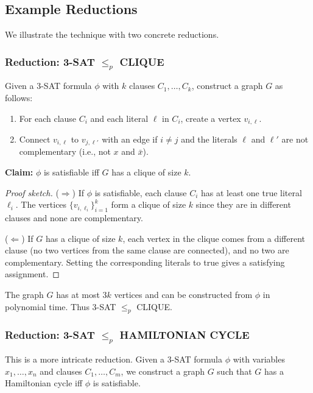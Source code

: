 \subsection{Example Reductions}

We illustrate the technique with two concrete reductions.

\subsubsection*{Reduction: 3-SAT $\leq_p$ CLIQUE}

Given a 3-SAT formula $\phi$ with $k$ clauses $C_1, \ldots, C_k$, construct a graph $G$ as follows:
\begin{enumerate}
  \item For each clause $C_i$ and each literal $\ell$ in $C_i$, create a vertex $v_{i,\ell}$.
  \item Connect $v_{i,\ell}$ to $v_{j,\ell'}$ with an edge if $i \neq j$ and the literals $\ell$ and $\ell'$ are not complementary (i.e., not $x$ and $\bar{x}$).
\end{enumerate}

\textbf{Claim:} $\phi$ is satisfiable iff $G$ has a clique of size $k$.

\begin{proof}[Proof sketch]
($\Rightarrow$) If $\phi$ is satisfiable, each clause $C_i$ has at least one true literal $\ell_i$. The vertices $\{v_{i,\ell_i}\}_{i=1}^k$ form a clique of size $k$ since they are in different clauses and none are complementary.

($\Leftarrow$) If $G$ has a clique of size $k$, each vertex in the clique comes from a different clause (no two vertices from the same clause are connected), and no two are complementary. Setting the corresponding literals to true gives a satisfying assignment.
\end{proof}

The graph $G$ has at most $3k$ vertices and can be constructed from $\phi$ in polynomial time. Thus 3-SAT $\leq_p$ CLIQUE.

\subsubsection*{Reduction: 3-SAT $\leq_p$ HAMILTONIAN CYCLE}

This is a more intricate reduction. Given a 3-SAT formula $\phi$ with variables $x_1, \ldots, x_n$ and clauses $C_1, \ldots, C_m$, we construct a graph $G$ such that $G$ has a Hamiltonian cycle iff $\phi$ is satisfiable.

